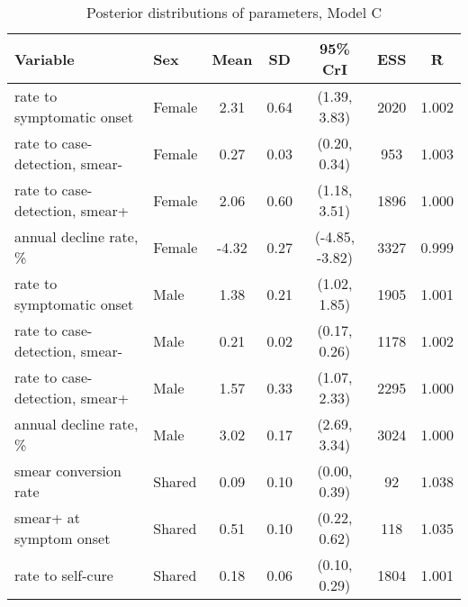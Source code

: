 \begin{table}[h]

\caption{\label{tab:}Posterior distributions of parameters, Model C}
\centering
\begin{tabular}[t]{llccccc}
\toprule
Variable & Sex & Mean & SD & 95\% CrI & ESS & \^{R}\\
\midrule
rate to symptomatic onset & Female & 2.31 & 0.64 & (1.39, 3.83) & 2020 & 1.002\\
rate to case-detection, smear- & Female & 0.27 & 0.03 & (0.20, 0.34) & 953 & 1.003\\
rate to case-detection, smear+ & Female & 2.06 & 0.60 & (1.18, 3.51) & 1896 & 1.000\\
annual decline rate, \% & Female & -4.32 & 0.27 & (-4.85, -3.82) & 3327 & 0.999\\
\addlinespace
rate to symptomatic onset & Male & 1.38 & 0.21 & (1.02, 1.85) & 1905 & 1.001\\
rate to case-detection, smear- & Male & 0.21 & 0.02 & (0.17, 0.26) & 1178 & 1.002\\
rate to case-detection, smear+ & Male & 1.57 & 0.33 & (1.07, 2.33) & 2295 & 1.000\\
annual decline rate, \% & Male & 3.02 & 0.17 & (2.69, 3.34) & 3024 & 1.000\\
\addlinespace
smear conversion rate & Shared & 0.09 & 0.10 & (0.00, 0.39) & 92 & 1.038\\
smear+ at symptom onset & Shared & 0.51 & 0.10 & (0.22, 0.62) & 118 & 1.035\\
rate to self-cure & Shared & 0.18 & 0.06 & (0.10, 0.29) & 1804 & 1.001\\
\bottomrule
\end{tabular}
\end{table}
